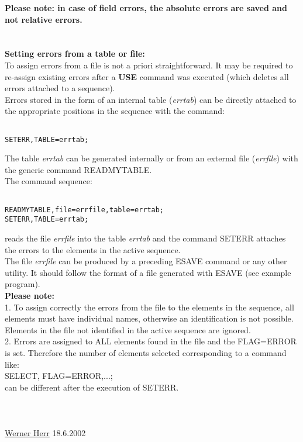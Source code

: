 \textbf{Please note: in case of field errors, the absolute errors are saved and not relative errors. }
\\
\\
\\\textbf{Setting errors from a table or file:}
\\ To assign errors from a file is not a priori straightforward. It may be required to re-assign existing errors after a \textbf{USE} command was executed (which deletes all errors attached to a sequence). 
\\ Errors stored in the form of an internal table (\textit{errtab}) can  be directly attached to the appropriate positions in the sequence with the command: 
\begin{verbatim}

SETERR,TABLE=errtab;
\end{verbatim}  The table \textit{errtab} can be generated internally or from an external file (\textit{errfile}) with the generic command READMYTABLE. 
\\ The command sequence: 
\begin{verbatim}

READMYTABLE,file=errfile,table=errtab;
SETERR,TABLE=errtab;
\end{verbatim}  reads the file \textit{errfile} into the table \textit{errtab} and the command SETERR attaches the errors to the elements in the active sequence. 
\\ The file \textit{errfile} can be produced by a preceding ESAVE command or any other utility. It should follow the format of a file generated with ESAVE (see example program). 
\\\textbf{Please note:  }
\\ 1. To assign correctly the errors from the file to the elements in the sequence, all elements must have individual names, otherwise an identification is not possible. Elements in the file not identified in the active sequence are ignored. 
\\ 2. Errors are assigned to ALL elements found in the file and the FLAG=ERROR is set. Therefore the number of elements selected corresponding to a command like: 
\\ SELECT, FLAG=ERROR,...;
\\ can be different after the execution of SETERR. 
\\
\\
\\
\\\href{http://consult.cern.ch/xwho/people/1808}{Werner Herr} 18.6.2002 


